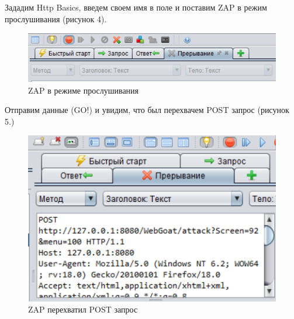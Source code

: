 \documentclass[10pt,a4paper]{article}
\begin{document}
\FloatBarrier
Зададим Http Basics, введем своем имя в поле и поставим ZAP в режим прослушивания (рисунок 4).
\FloatBarrier
\begin{figure}[h!]
\centering
\includegraphics[scale=0.4]{4}
\caption{ZAP в режиме прослушивания}
\end{figure}
\FloatBarrier
Отправим данные (GO!) и увидим, что был перехвачем POST запрос (рисунок 5.)
\FloatBarrier
\begin{figure}[h!]
\centering
\includegraphics[scale=0.4]{5}
\caption{ZAP перехватил POST запрос}
\end{figure}
\FloatBarrier
\end{document}
